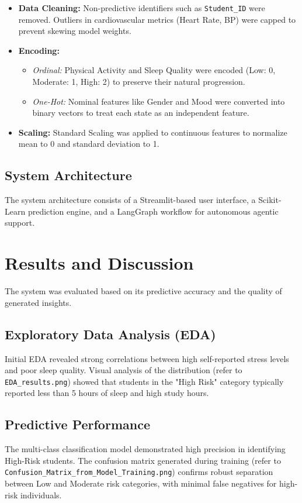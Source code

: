 \documentclass[12pt,a4paper]{article}
\begin{document}
\begin{itemize}
    \item \textbf{Data Cleaning:} Non-predictive identifiers such as \texttt{Student\_ID} were removed. Outliers in cardiovascular metrics (Heart Rate, BP) were capped to prevent skewing model weights.
    \item \textbf{Encoding:} 
    \begin{itemize}
        \item \textit{Ordinal:} Physical Activity and Sleep Quality were encoded (Low: 0, Moderate: 1, High: 2) to preserve their natural progression.
        \item \textit{One-Hot:} Nominal features like Gender and Mood were converted into binary vectors to treat each state as an independent feature.
    \end{itemize}
    \item \textbf{Scaling:} Standard Scaling was applied to continuous features to normalize mean to 0 and standard deviation to 1.
\end{itemize}

\subsection{System Architecture}
The system architecture consists of a Streamlit-based user interface, a Scikit-Learn prediction engine, and a LangGraph workflow for autonomous agentic support.

\section{Results and Discussion}
The system was evaluated based on its predictive accuracy and the quality of generated insights.

\subsection{Exploratory Data Analysis (EDA)}
Initial EDA revealed strong correlations between high self-reported stress levels and poor sleep quality. Visual analysis of the distribution (refer to \texttt{EDA\_results.png}) showed that students in the "High Risk" category typically reported less than 5 hours of sleep and high study hours.

\subsection{Predictive Performance}
The multi-class classification model demonstrated high precision in identifying High-Risk students. The confusion matrix generated during training (refer to \texttt{Confusion\_Matrix\_from\_Model\_Training.png}) confirms robust separation between Low and Moderate risk categories, with minimal false negatives for high-risk individuals.
\end{document}
